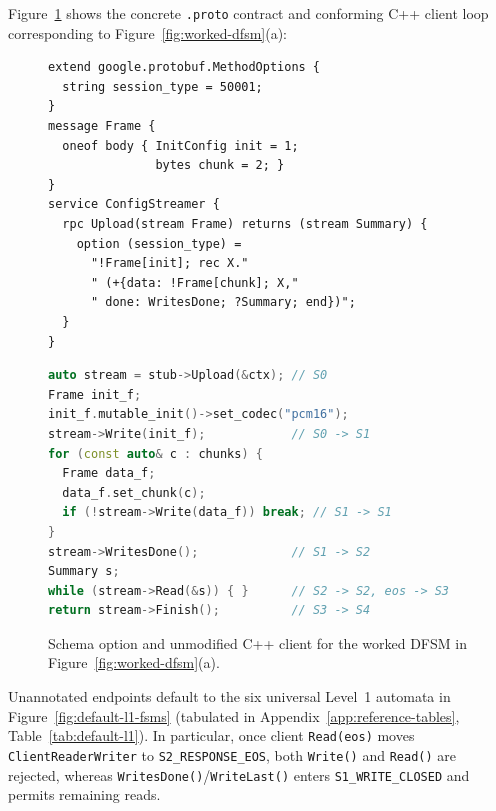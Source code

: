 Figure~\ref{lst:worked-code} shows the concrete \texttt{.proto} contract and conforming C++ client loop corresponding to Figure~\ref{fig:worked-dfsm}(a):
\begin{figure}[htbp]
\centering
\begin{minipage}[t]{0.47\textwidth}
\begin{lstlisting}[morekeywords={extend,message,oneof,service,rpc,returns,stream,option,string,bytes},title={\scriptsize\textbf{.proto} custom option (\texttt{ConfigStreamer})}]
extend google.protobuf.MethodOptions {
  string session_type = 50001;
}
message Frame {
  oneof body { InitConfig init = 1;
               bytes chunk = 2; }
}
service ConfigStreamer {
  rpc Upload(stream Frame) returns (stream Summary) {
    option (session_type) =
      "!Frame[init]; rec X."
      " (+{data: !Frame[chunk]; X,"
      " done: WritesDone; ?Summary; end})";
  }
}
\end{lstlisting}
\end{minipage}\hfill
\begin{minipage}[t]{0.50\textwidth}
\begin{lstlisting}[language=C++,title={\scriptsize\textbf{C++ client} (\texttt{S0}$\to$\texttt{S1}$\to$\texttt{S2}$\to$\texttt{S3}$\to$\texttt{S4})}]
auto stream = stub->Upload(&ctx); // S0
Frame init_f;
init_f.mutable_init()->set_codec("pcm16");
stream->Write(init_f);            // S0 -> S1
for (const auto& c : chunks) {
  Frame data_f;
  data_f.set_chunk(c);
  if (!stream->Write(data_f)) break; // S1 -> S1
}
stream->WritesDone();             // S1 -> S2
Summary s;
while (stream->Read(&s)) { }      // S2 -> S2, eos -> S3
return stream->Finish();          // S3 -> S4
\end{lstlisting}
\end{minipage}
\caption{Schema option and unmodified C++ client for the worked DFSM in Figure~\ref{fig:worked-dfsm}(a).}
\label{lst:worked-code}
\end{figure}

Unannotated endpoints default to the six universal Level~1 automata in Figure~\ref{fig:default-l1-fsms} (tabulated in Appendix~\ref{app:reference-tables}, Table~\ref{tab:default-l1}). In particular, once client \texttt{Read(eos)} moves \texttt{ClientReaderWriter} to \texttt{S2\_RESPONSE\_EOS}, both \texttt{Write()} and \texttt{Read()} are rejected, whereas \texttt{WritesDone()}/\texttt{WriteLast()} enters \texttt{S1\_WRITE\_CLOSED} and permits remaining reads.

